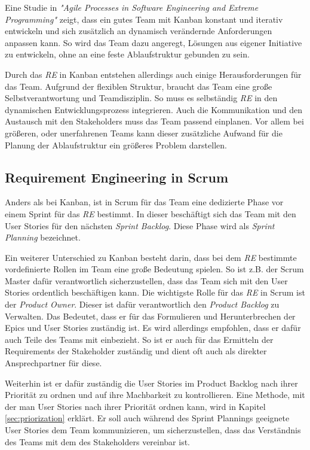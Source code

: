 \documentclass[acmtog]{acmart}
\begin{document}
Eine Studie in \emph{"Agile Processes in Software Engineering and Extreme Programming"} \cite{agileprocesses} zeigt, dass ein gutes Team mit Kanban konstant und iterativ entwickeln und sich zusätzlich 
an dynamisch verändernde Anforderungen anpassen kann. So wird das Team dazu angeregt, Lösungen aus eigener 
Initiative zu entwickeln, ohne an eine feste Ablaufstruktur gebunden zu sein. \cite{reqkanban}

Durch das \emph{RE} in Kanban entstehen allerdings auch einige Herausforderungen für das Team. Aufgrund der flexiblen 
Struktur, braucht das Team eine große Selbstverantwortung und Teamdisziplin. So muss es selbständig \emph{RE} in den 
dynamischen Entwicklungsprozess integrieren. Auch die Kommunikation und den Austausch mit den Stakeholders muss 
das Team passend einplanen. Vor allem bei größeren, oder unerfahrenen Teams kann dieser zusätzliche Aufwand für 
die Planung der Ablaufstruktur ein größeres Problem darstellen. \cite{kanbannod}

\subsection{Requirement Engineering in Scrum}

Anders als bei Kanban, ist in Scrum für das Team eine dedizierte Phase vor einem Sprint für das \emph{RE} bestimmt. In dieser 
beschäftigt sich das Team mit den User Stories für den nächsten \emph{Sprint Backlog}. Diese Phase wird als \emph{Sprint Planning} bezeichnet. \cite{reinscrum}

Ein weiterer Unterschied zu Kanban besteht darin, dass bei dem \emph{RE} bestimmte vordefinierte Rollen im Team eine 
große Bedeutung spielen. So ist z.B. der Scrum Master dafür verantwortlich sicherzustellen, dass das Team sich mit den 
User Stories ordentlich beschäftigen kann. Die wichtigste Rolle für das \emph{RE} in Scrum ist der \emph{Product Owner}. Dieser ist 
dafür verantwortlich den \emph{Product Backlog} zu Verwalten. Das Bedeutet, dass er für das Formulieren und Herunterbrechen der 
Epics und User Stories zuständig ist. Es wird allerdings empfohlen, dass er dafür auch Teile des Teams mit einbezieht. So ist er auch für 
das Ermitteln der Requirements der Stakeholder zuständig und dient oft auch als direkter Ansprechpartner für diese. \cite{reinscrum}

Weiterhin ist er dafür zuständig die User Stories im Product Backlog nach ihrer Priorität zu ordnen und auf ihre Machbarkeit 
zu kontrollieren. Eine Methode, mit der man User Stories nach ihrer Priorität ordnen kann, wird in Kapitel \ref{sec:priorization} erklärt. 
Er soll auch während des Sprint Plannings geeignete User Stories dem Team kommunizieren, um sicherzustellen, dass das Verständnis 
des Teams mit dem des Stakeholders vereinbar ist. \cite{reinscrum}
\end{document}
